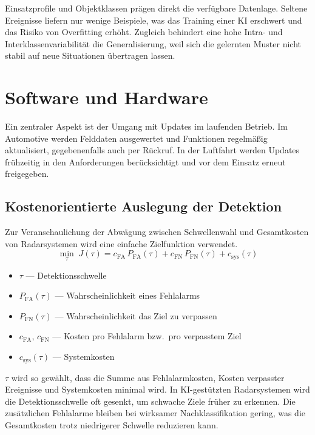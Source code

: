 Einsatzprofile und Objektklassen prägen direkt die verfügbare Datenlage. 
Seltene Ereignisse liefern nur wenige Beispiele, was das Training einer KI erschwert 
und das Risiko von Overfitting erhöht. Zugleich behindert eine hohe Intra- 
und Interklassenvariabilität die Generalisierung, weil sich die gelernten 
Muster nicht stabil auf neue Situationen übertragen lassen.



\section{Software und Hardware} \label{sec:sw_u_hw}

Ein zentraler Aspekt ist der Umgang mit Updates im laufenden Betrieb. Im Automotive werden Felddaten 
ausgewertet und Funktionen regelmäßig aktualisiert, gegebenenfalls auch per Rückruf. In der 
Luftfahrt werden Updates frühzeitig in den Anforderungen berücksichtigt und vor dem Einsatz erneut freigegeben.

\subsection*{Kostenorientierte Auslegung der Detektion}
Zur Veranschaulichung der Abwägung zwischen Schwellenwahl und Gesamtkosten von Radarsystemen wird eine einfache Zielfunktion verwendet.
\[
\min_{\tau}\; J(\tau)
= c_{\mathrm{FA}}\,P_{\mathrm{FA}}(\tau)
+ c_{\mathrm{FN}}\,P_{\mathrm{FN}}(\tau)
+ c_{\mathrm{sys}}(\tau)
\]
\begin{itemize}
  \item $\tau$ — Detektionsschwelle
  \item $P_{\mathrm{FA}}(\tau)$ — Wahrscheinlichkeit eines Fehlalarms
  \item $P_{\mathrm{FN}}(\tau)$ — Wahrscheinlichkeit das Ziel zu verpassen
  \item $c_{\mathrm{FA}},\,c_{\mathrm{FN}}$ — Kosten pro Fehlalarm bzw.\ pro verpasstem Ziel
  \item $c_{\mathrm{sys}}(\tau)$ — Systemkosten
\end{itemize}

\medskip
$\tau$ wird so gewählt, dass die Summe aus Fehlalarmkosten, Kosten verpasster Ereignisse 
und Systemkosten minimal wird. 
In KI-gestützten Radarsystemen wird die Detektionsschwelle oft gesenkt, um schwache Ziele früher zu erkennen. 
Die zusätzlichen Fehlalarme bleiben bei wirksamer Nachklassifikation gering, was die Gesamtkosten trotz niedrigerer Schwelle reduzieren kann.


